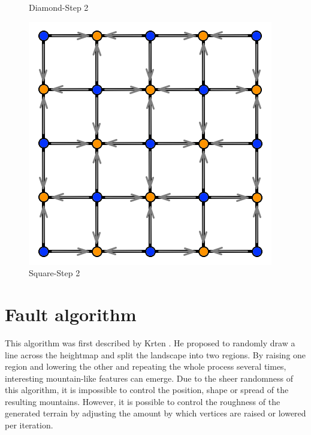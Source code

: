 \documentclass[11pt,a4paper,twoside,openright]{report}
\begin{document}
\begin{figure}[!htb]
  \caption{Diamond-Step 2}\label{fig:ds4}
\endminipage
{}%
  \includegraphics[width=\linewidth]{ds5.png}
  \caption{Square-Step 2}\label{fig:ds5}
\endminipage
\end{figure}

\section{Fault algorithm}
This algorithm was first described by Krten \cite{Krten:1994}. He proposed to randomly draw a line across the heightmap and split the landscape into two regions. By raising one region and lowering the other and repeating the whole process several times, interesting mountain-like features can emerge. Due to the sheer randomness of this algorithm, it is impossible to control the position, shape or spread of the resulting mountains. However, it is possible to control the roughness of the generated terrain by adjusting the amount by which vertices are raised or lowered per iteration.
\end{document}

